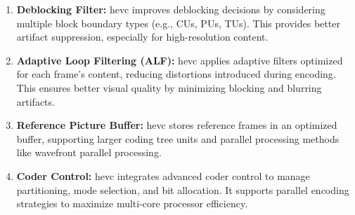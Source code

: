 \begin{enumerate}[label=\textbf{\roman*.}]
        \item \textbf{Deblocking Filter:}  
        \gls{hevc} improves deblocking decisions by considering multiple block boundary types (e.g., CUs, PUs, TUs). This provides better artifact suppression, especially for high-resolution content.
    
        \item \textbf{Adaptive Loop Filtering (ALF):}  
        \gls{hevc} applies adaptive filters optimized for each frame's content, reducing distortions introduced during encoding. This ensures better visual quality by minimizing blocking and blurring artifacts.
    
        \item \textbf{Reference Picture Buffer:}  
        \gls{hevc} stores reference frames in an optimized buffer, supporting larger coding tree units and parallel processing methods like wavefront parallel processing.
    
        \item \textbf{Coder Control:}  
        \gls{hevc} integrates advanced coder control to manage partitioning, mode selection, and bit allocation. It supports parallel encoding strategies to maximize multi-core processor efficiency.
    \end{enumerate}


\pagebreak

